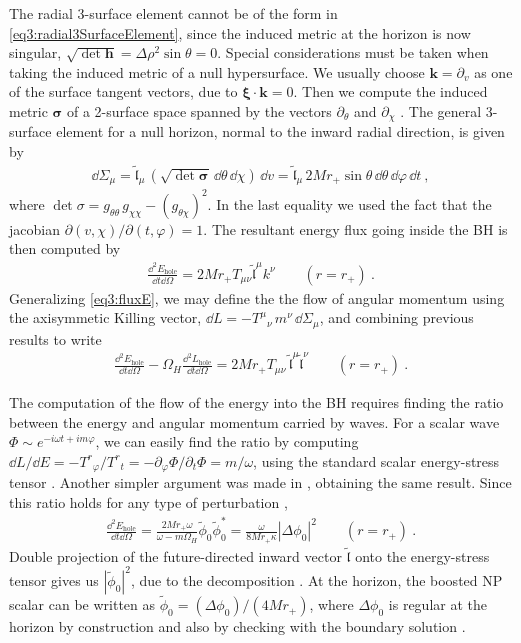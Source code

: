 The radial 3-surface element cannot be of the form in \eqref{eq3:radial3SurfaceElement}, since the induced metric at the horizon is now singular, $\sqrt{\det{\bm{h}}}=\Delta \rho^2 \sin\theta = 0$.
Special considerations must be taken when taking the induced metric of a null hypersurface.
We usually choose $\bm{k}=\partial_v$ as one of the surface tangent vectors, due to $\bm{\xi}\cdot\bm{k}=0$.
Then we compute the induced metric $\bm{\sigma}$ of a 2-surface space spanned by the vectors $\partial_\theta$ and $\partial_\chi$ \cite{Poisson2004}.
The general 3-surface element for a null horizon, normal to the inward radial direction, is given by
\begin{align}
    \dd\Sigma_\mu = \tilde{\mathfrak{l}}_\mu \,(\sqrt{\det \bm{\sigma}} \,\dd\theta \,\dd\chi ) \,\dd v = \tilde{\mathfrak{l}}_\mu  \, 2 M r_+ \sin\theta \,\dd\theta \,\dd\varphi \,\dd t ~,
\end{align}
where $\det\sigma = g_{\theta\theta} \,g_{\chi\chi} - (g_{\theta\chi})^2$. In the last equality we used the fact that the jacobian $\partial(v,\chi)/\partial(t,\varphi)=1$.
The resultant energy flux going inside the BH is then computed by
\begin{align}
    \frac{\dd^2 E_\mathrm{hole}}{\dd t \dd\Omega} = 2 M r_{+} T_{\mu\nu} \tilde{\mathfrak{l}}^\mu k^\nu \qquad (r=r_{+})~.
\end{align}
Generalizing \eqref{eq3:fluxE}, we may define the the flow of angular momentum using the axisymmetic Killing vector, $\dd L = - T^{\mu}{}_\nu \, m^\nu \,\dd\Sigma_\mu$, and combining previous results to write
\begin{align}
    \frac{\dd^2 E_\mathrm{hole}}{\dd t \dd\Omega} - \Omega_H \frac{\dd^2 L_\mathrm{hole}}{\dd t \dd\Omega} = 2 M r_{+} T_{\mu\nu} \,\tilde{\mathfrak{l}}^\mu \tilde{\mathfrak{l}}^\nu \qquad (r=r_{+})~.
\end{align}

The computation of the flow of the energy into the BH requires finding the ratio between the energy and angular momentum carried by waves.
For a scalar wave $\Phi\sim e^{-i\omega t+ i m\varphi}$, we can easily find the ratio by computing $\dd L/\dd E = -T^r{}_\varphi/T^r{}_t = - \partial_\varphi \Phi / \partial_t \Phi = m/\omega$, using the standard scalar energy-stress tensor \cite{Bekenstein1973}.
Another simpler argument was made in , obtaining the same result.
Since this ratio holds for any type of perturbation \cite{Teukolsky1974},
\begin{align}
    \frac{\dd^2 E_\mathrm{hole}}{\dd t \dd\Omega} = \frac{2 M r_{+} \omega}{\omega - m \Omega_H}  \tilde{\phi}_0 \tilde{\phi}_0^* = \frac{\omega}{8 M r_{+} \kappa} |\Delta \phi_0 |^2 \qquad (r=r_{+})~.
\end{align}
Double projection of the future-directed inward vector $\bm{\tilde{\mathfrak{l}}}$ onto the energy-stress tensor gives us $|\tilde{\phi}_0|^2$, due to the decomposition .
At the horizon, the boosted NP scalar can be written as $\tilde{\phi}_0 = (\Delta \phi_0)/(4 M r_{+})$, where $\Delta \phi_0$ is regular at the horizon by construction and also by checking with the boundary solution .

